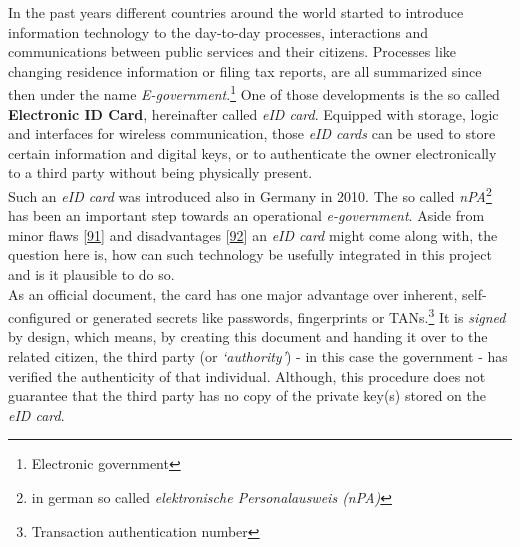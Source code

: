 \documentclass[12pt,english,a4paper,titlepage,cleardoublepage=empty,dottedtoc]{report}
\begin{document}
In the past years different countries around the world started to
introduce information technology to the day-to-day processes,
interactions and communications between public services and their
citizens. Processes like changing residence information or filing tax
reports, are all summarized since then under the name
\emph{E-government}.\footnote{Electronic government} One of those
developments is the so called
\textbf{\protect\hypertarget{def--eid-card}{}{Electronic ID Card}},
hereinafter called \emph{eID card}. Equipped with storage, logic and
interfaces for wireless communication, those \emph{eID cards} can be
used to store certain information and digital keys, or to authenticate
the owner electronically to a third party without being physically
present.\\
Such an \emph{eID card} was introduced also in Germany in 2010. The so
called \emph{nPA}\footnote{in german so called \emph{elektronische
  Personalausweis (nPA)}} has been an important step towards an
operational \emph{e-government}. Aside from minor flaws
{[}\protect\hyperlink{ref-web_2013_npa-sicherheitsdefizit}{91}{]} and
disadvantages
{[}\protect\hyperlink{ref-web_2014_test-qes-support-in-npa}{92}{]} an
\emph{eID card} might come along with, the question here is, how can
such technology be usefully integrated in this project and is it
plausible to do so.\\
As an official document, the card has one major advantage over inherent,
self-configured or generated secrets like passwords, fingerprints or
TANs.\footnote{Transaction authentication number} It is \emph{signed} by
design, which means, by creating this document and handing it over to
the related citizen, the third party (or \emph{`authority'}) - in this
case the government - has verified the authenticity of that individual.
Although, this procedure does not guarantee that the third party has no
copy of the private key(s) stored on the \emph{eID card}.
\end{document}
